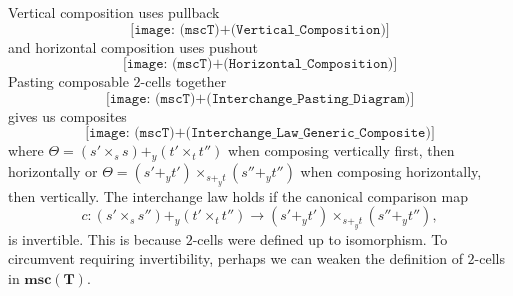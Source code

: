 \documentclass[11pt]{amsart}
\newcommand{\cat}[1]{\mathbf{#1}}
\newcommand{\from}{\colon}
\theoremstyle{remark}
\theoremstyle{definition}
\begin{document}
Vertical composition uses pullback
\begin{equation}
\label{eq:vertical composition}
	\texttt{[image: (mscT)+(Vertical\_Composition)]}
\end{equation}
and horizontal composition uses pushout
\[
	\texttt{[image: (mscT)+(Horizontal\_Composition)]}
\]
Pasting composable $2$-cells together
\begin{equation}
\label{eq:horizontal composition}
	\texttt{[image: (mscT)+(Interchange\_Pasting\_Diagram)]}
\end{equation}
gives us composites
\[
	\texttt{[image: (mscT)+(Interchange\_Law\_Generic\_Composite)]}
\]
where $\Theta = (s' \times_s s) +_y (t' \times_t t'')$ when composing vertically first, then horizontally or $\Theta = (s' +_y t') \times_{s +_y t} (s'' +_y t'')$ when composing horizontally, then vertically.  The interchange law holds if the canonical comparison map
\begin{equation}
\label{eq:interchange comparison map}
	c \from (s' \times_s s'') +_y (t' \times_t t'') 
	\to (s' +_y t') \times_{s +_y t} (s'' +_y t''),
\end{equation}
is invertible. This is because $2$-cells were defined up to isomorphism.  To circumvent requiring invertibility, perhaps we can weaken the definition of $2$-cells in $\cat{msc}(\cat{T})$. 
\end{document}
